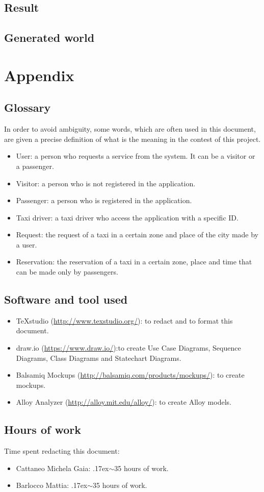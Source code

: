 \documentclass[18pt,oneside,a4paper, titlepage]{article}
\begin{document}
	\subsection{Result}
	\subsection{Generated world}

\newpage
\section{Appendix}
	\subsection{Glossary}
		In order to avoid ambiguity, some words, which are often used in this document, are given a precise definition of what is the meaning in the contest of this project.
		\begin{itemize}
			\item User: a person who requests a service from the system. It can be a visitor or a passenger.
			\item Visitor: a person who is not registered in the application.
			\item Passenger: a person who is registered in the application.
			\item Taxi driver: a taxi driver who access the application with a specific ID.
			\item Request: the request of a taxi in a certain zone and place of the city made by a user.
			\item Reservation: the reservation of a taxi in a certain zone, place and time that can be made only by passengers.
	\end{itemize}
	\subsection{Software and tool used}
		\begin{itemize}
			\item TeXstudio (\url{http://www.texstudio.org/}): to redact and to format this document.
			\item draw.io (\url{https://www.draw.io/}):to create Use Case Diagrams, Sequence Diagrams, Class Diagrams and Statechart Diagrams.
			\item Balsamiq Mockups (\url{http://balsamiq.com/products/mockups/}): to create mockups.
			\item Alloy Analyzer (\url{http://alloy.mit.edu/alloy/}): to create Alloy models.
		\end{itemize}
	
	\subsection{Hours of work}
		Time spent redacting this document:
		\begin{itemize}
			\item Cattaneo Michela Gaia: {\raise.17ex\hbox{$\scriptstyle\sim$}}35 hours of work.
			\item Barlocco Mattia: {\raise.17ex\hbox{$\scriptstyle\sim$}}35 hours of work.
		\end{itemize}
\end{document}
